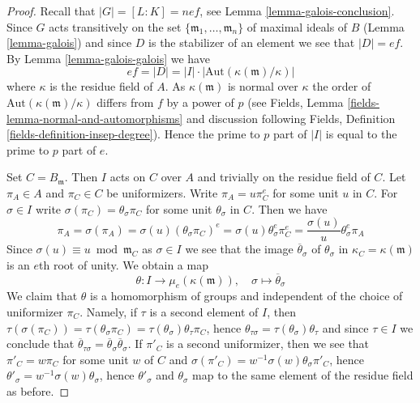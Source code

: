 \begin{proof}
Recall that $|G| = [L : K] = nef$, see Lemma \ref{lemma-galois-conclusion}.
Since $G$ acts transitively on the set
$\{\mathfrak m_1, \ldots, \mathfrak m_n\}$ of maximal ideals of $B$
(Lemma \ref{lemma-galois})
and since $D$ is the stabilizer of an element we see that $|D| = ef$.
By Lemma \ref{lemma-galois-galois} we have
$$
ef = |D| = |I| \cdot |\text{Aut}(\kappa(\mathfrak m)/\kappa)|
$$
where $\kappa$ is the residue field of $A$.
As $\kappa(\mathfrak m)$ is normal over $\kappa$ the order of
$\text{Aut}(\kappa(\mathfrak m)/\kappa)$ differs from $f$ by
a power of $p$ (see
Fields, Lemma \ref{fields-lemma-normal-and-automorphisms}
and discussion following
Fields, Definition \ref{fields-definition-insep-degree}).
Hence the prime to $p$ part
of $|I|$ is equal to the prime to $p$ part of $e$.

\medskip\noindent
Set $C = B_\mathfrak m$. Then $I$ acts on $C$ over $A$ and trivially
on the residue field of $C$. Let $\pi_A \in A$ and $\pi_C \in C$ be
uniformizers. Write $\pi_A = u \pi_C^e$ for some unit $u$ in $C$.
For $\sigma \in I$ write $\sigma(\pi_C) = \theta_\sigma \pi_C$ for some
unit $\theta_\sigma$ in $C$. Then we have
$$
\pi_A = \sigma(\pi_A) = \sigma(u) (\theta_\sigma \pi_C)^e
= \sigma(u) \theta_\sigma^e \pi_C^e = \frac{\sigma(u)}{u} \theta_\sigma^e \pi_A
$$
Since $\sigma(u) \equiv u \bmod \mathfrak m_C$ as $\sigma \in I$
we see that the image $\overline{\theta}_\sigma$
of $\theta_\sigma$ in $\kappa_C = \kappa(\mathfrak m)$
is an $e$th root of unity.
We obtain a map
\begin{equation}
\label{equation-inertia-character}
\theta : I \longrightarrow \mu_e(\kappa(\mathfrak m)),\quad
\sigma \mapsto \overline{\theta}_\sigma
\end{equation}
We claim that $\theta$ is a homomorphism of groups and independent
of the choice of uniformizer $\pi_C$. Namely, if $\tau$ is a second
element of $I$, then
$\tau(\sigma(\pi_C)) = \tau(\theta_\sigma \pi_C) =
\tau(\theta_\sigma) \theta_\tau \pi_C$, hence
$\theta_{\tau \sigma} = \tau(\theta_\sigma) \theta_\tau$ and
since $\tau \in I$ we conclude that
$\overline{\theta}_{\tau \sigma} =
\overline{\theta}_\sigma \overline{\theta}_\sigma$.
If $\pi'_C$ is a second uniformizer, then we see
that $\pi'_C = w \pi_C$ for some unit $w$ of $C$ and
$\sigma(\pi'_C) = w^{-1}\sigma(w)\theta_\sigma \pi'_C$,
hence $\theta'_\sigma = w^{-1}\sigma(w)\theta_\sigma$,
hence $\theta'_\sigma$ and $\theta_\sigma$
map to the same element of the residue field as before.


\end{proof}
